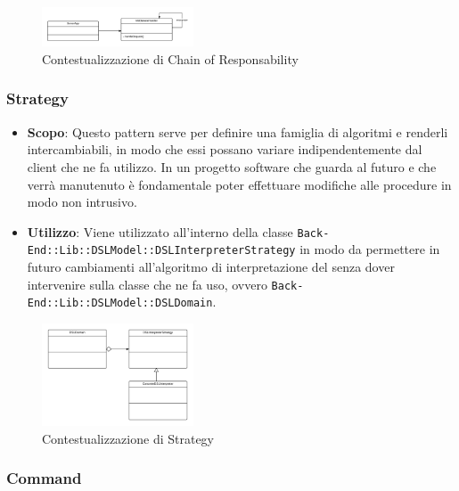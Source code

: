 \begin{figure}[H]
\centering \includegraphics[width=0.4\textwidth]{patterns/contestualizzazione/chain-of-responsability.png}
\caption{Contestualizzazione di Chain of Responsability}
\label{fig:mvc}
\end{figure}

\subsubsection{Strategy}

\begin{itemize}

	\item \textbf{Scopo}: Questo pattern serve per definire una famiglia di algoritmi e renderli intercambiabili, in modo che essi possano variare indipendentemente dal client che ne fa utilizzo. In un progetto software che guarda al futuro e che verrà manutenuto è fondamentale poter effettuare modifiche alle procedure in modo non intrusivo.
	\item \textbf{Utilizzo}: Viene utilizzato all'interno della classe \texttt{Back-End::Lib::DSLModel::DSLInterpreterStrategy} in modo da permettere in futuro cambiamenti all'algoritmo di interpretazione del  senza dover intervenire sulla classe che ne fa uso, ovvero \texttt{Back-End::Lib::DSLModel::DSLDomain}.

\end{itemize}

\begin{figure}[H]
\centering \includegraphics[width=0.4\textwidth]{patterns/contestualizzazione/strategy.png}
\caption{Contestualizzazione di Strategy}
\label{fig:mvc}
\end{figure}

\subsubsection{Command}

